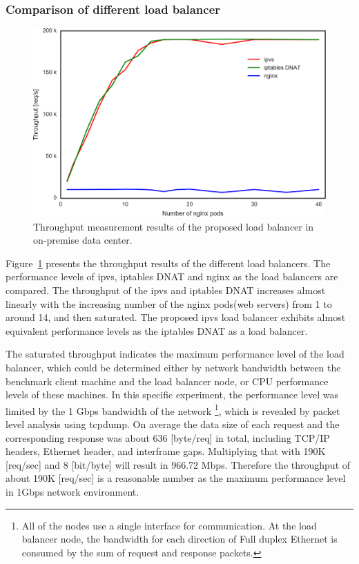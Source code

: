 \FloatBarrier

\subsubsection{Comparison of different load balancer}

\begin{figure}[h]
  \includegraphics[width=0.8\columnwidth]{Figs/ipvs-iptables-nginx}
  \par\bigskip
  \centering
  \begin{minipage}{0.8\columnwidth}
    \caption{Throughput measurement results of the proposed load balancer in on-premise data center.}
    \label{fig:ipvs-iptables-nginx}
  \end{minipage}
\end{figure}


Figure~\ref{fig:ipvs-iptables-nginx} presents the throughput results of the different load balancers.
The performance levels of ipvs, iptables DNAT and nginx as the load balancers are compared.
The throughput of the ipvs and iptables DNAT increases almost linearly with the increasing number of the nginx pods(web servers) from 1 to around 14, and then saturated.
The proposed ipvs load balancer exhibits almost equivalent performance levels as the iptables DNAT as a load balancer.

The saturated throughput indicates the maximum performance level of the load balancer, which could be determined either by network bandwidth between the benchmark client machine and the load balancer node, or CPU performance levels of these machines.
%
In this specific experiment, the performance level was limited by the 1 Gbps bandwidth of the network
\footnote{
All of the nodes use a single interface for communication. 
At the load balancer node, the bandwidth for each direction of Full duplex Ethernet is consumed by the sum of request and response packets.
}, 
which is revealed by packet level analysis using tcpdump\cite{takahashi2018portable}.
%
On average the data size of each request and the corresponding response was about 636 [byte/req] in total, including TCP/IP headers, Ethernet header, and interframe gaps.
Multiplying that with 190K [req/sec] and 8 [bit/byte] will result in 966.72 Mbps.
Therefore the throughput of about 190K [req/sec] is a reasonable number as the maximum performance level in 1Gbps network environment.

